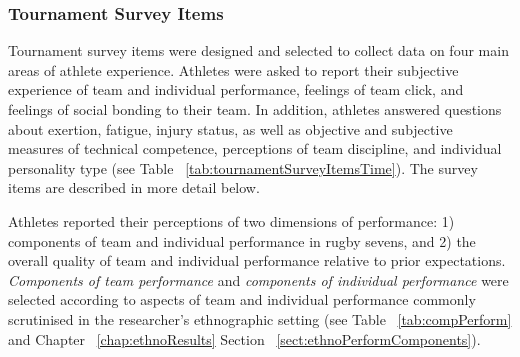 \begin{CJK}{UTF8}{gbsn}


\subsubsection{Tournament Survey Items\label{survey:Tournament Survey Items}}

Tournament survey items were designed and selected to collect data on four main areas of athlete experience.  Athletes were asked to report their subjective experience of team and individual performance, feelings of team click, and feelings of social bonding to their team.  In addition, athletes answered questions about exertion, fatigue, injury status, as well as objective and subjective measures of technical competence, perceptions of team discipline, and individual personality type (see Table ~\ref{tab:tournamentSurveyItemsTime}). The survey items are described in more detail below.




Athletes reported their perceptions of two dimensions of performance: 1) components of team and individual performance in rugby sevens, and 2) the overall quality of team and individual performance relative to prior expectations.  \textit{Components of team performance} and \textit{components of individual performance} were selected according to aspects of team and individual performance commonly scrutinised in the researcher's ethnographic setting (see Table ~\ref{tab:compPerform} and Chapter ~\ref{chap:ethnoResults} Section ~\ref{sect:ethnoPerformComponents}).




\end{CJK}
